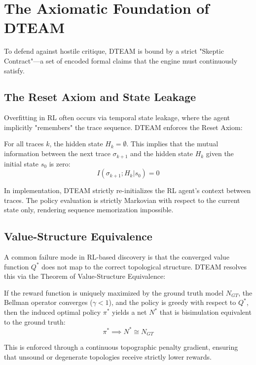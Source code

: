 \chapter{The Axiomatic Foundation of DTEAM}
To defend against hostile critique, DTEAM is bound by a strict "Skeptic Contract"—a set of encoded formal claims that the engine must continuously satisfy.

\section{The Reset Axiom and State Leakage}
Overfitting in RL often occurs via temporal state leakage, where the agent implicitly "remembers" the trace sequence. DTEAM enforces the Reset Axiom:
\begin{axiom}
For all traces $k$, the hidden state $H_k = \emptyset$. This implies that the mutual information between the next trace $\sigma_{k+1}$ and the hidden state $H_k$ given the initial state $s_0$ is zero:
\begin{equation}
I(\sigma_{k+1}; H_k | s_0) = 0
\end{equation}
\end{axiom}
In implementation, DTEAM strictly re-initializes the RL agent's context between traces. The policy evaluation is strictly Markovian with respect to the current state only, rendering sequence memorization impossible.

\section{Value-Structure Equivalence}
A common failure mode in RL-based discovery is that the converged value function $Q^*$ does not map to the correct topological structure. DTEAM resolves this via the Theorem of Value-Structure Equivalence:
\begin{theorem}
If the reward function is uniquely maximized by the ground truth model $N_{GT}$, the Bellman operator converges ($\gamma < 1$), and the policy is greedy with respect to $Q^*$, then the induced optimal policy $\pi^*$ yields a net $N^*$ that is bisimulation equivalent to the ground truth:
\begin{equation}
\pi^* \implies N^* \cong N_{GT}
\end{equation}
\end{theorem}
This is enforced through a continuous topographic penalty gradient, ensuring that unsound or degenerate topologies receive strictly lower rewards.
